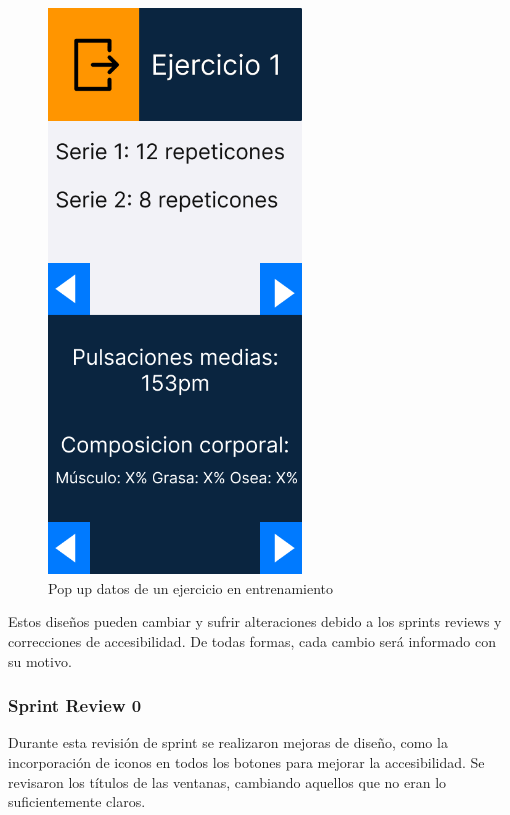 \begin{figure}[H]
   \centering
    \includegraphics[width=0.6\textwidth]{fotos/Frame 35.png}
    \caption{Pop up datos de un ejercicio en entrenamiento}
    \label{fig:Pop up datos de un ejercicio en entrenamiento}
\end{figure}


Estos diseños pueden cambiar y sufrir alteraciones debido a los sprints reviews y correcciones de accesibilidad. De todas formas, cada cambio será informado con su motivo.

\subsubsection{Sprint Review 0}
Durante esta revisi\'on de sprint se realizaron mejoras de dise\~no, como la incorporaci\'on de iconos en todos los botones para mejorar la accesibilidad. Se revisaron los t\'itulos de las ventanas, cambiando aquellos que no eran lo suficientemente claros.

